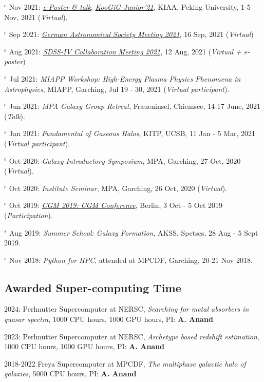\documentclass[12pt,letterpaper]{article}
\begin{document}
\begin{list}{}{\cvlist}
\item $^c$ Nov 2021:  \emph{\href{https://www.bilibili.com/video/BV1nv411M7w3}{e-Poster \& talk}}, \emph{\href{https://kiaa.pku.edu.cn/KooGig_junior21/Home.htm}{KooGiG-Junior'21}}, KIAA, Peking University, 1-5 Nov, 2021 (\textit{Virtual}).

\item $^c$ Sep 2021:  \emph{\href{https://ag2021.astronomische-gesellschaft.de/view_splinter.php?session=Stars}{German Astronomical Society Meeting 2021}}, 16 Sep, 2021 (\textit{Virtual})
\item $^c$ Aug 2021:  \emph{\href{https://jhu2021.sdss.org/}{SDSS-IV Collaboration Meeting 2021}}, 12 Aug, 2021 (\textit{Virtual + e-poster})
\item $^s$ Jul 2021:  \emph{MIAPP Workshop: High-Energy Plasma Physics Phenomena in Astrophysics}, MIAPP, Garching, Jul 19 - 30, 2021 (\textit{Virtual participant}).

\item $^c$ Jun 2021:  \emph{MPA Galaxy Group Retreat}, Fraueninsel, Chiemsee, 14-17 June, 2021 (\textit{Talk}).
\item $^s$ Jan 2021:  \emph{Fundamental of Gaseous Halos}, KITP, UCSB, 11 Jan - 5 Mar, 2021 (\textit{Virtual participant}).
\item $^c$ Oct 2020:  \emph{Galaxy Introductory Symposium}, MPA, Garching, 27 Oct, 2020 (\textit{Virtual}).
\item $^c$ Oct 2020:  \emph{Institute Seminar}, MPA, Garching, 26 Oct, 2020 (\textit{Virtual}).

\item $^c$ Oct 2019:  \emph{\href{https://wwwmpa.mpa-garching.mpg.de/conf/berlincgm2019/}{CGM 2019: CGM Conference}}, Berlin, 3 Oct - 5 Oct 2019 (\textit{Participation}).
\item $^s$ Aug 2019:  \emph{Summer School: Galaxy Formation}, AKSS, Spetses, 28 Aug - 5 Sept 2019.
\item $^s$ Nov 2018:  \emph{Python for HPC}, attended at MPCDF, Garching, 20-21 Nov 2018.
\end{list}

\subsection{Awarded Super-computing Time}
\begin{list}{}{\cvlist}
\item 2024: Perlmutter Supercomputer at NERSC, \textit{Searching for metal absorbers in quasar spectra}, 1000 CPU hours, 1000 GPU hours, PI: \textbf{A. Anand}
\item 2023: Perlmutter Supercomputer at NERSC,  \textit{Archetype based redshift estimation}, 1000 CPU hours, 1000 GPU hours, PI: \textbf{A. Anand}
\item 2018-2022 Freya Supercomputer at MPCDF,  \textit{The multiphase galactic halo of galaxies}, 5000 CPU hours, PI: \textbf{A. Anand}
\end{list}
\end{document}
